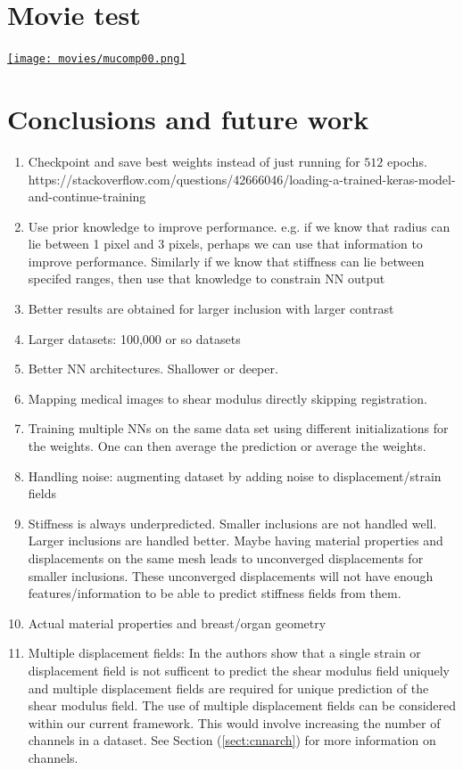\documentclass[12pt]{article}
\begin{document}
\section{Movie test}
\href{run:movies/movie.mp4}{\texttt{[image: movies/mucomp00.png]}}
\section{Conclusions and future work}
\begin{enumerate}
\item{Checkpoint and save best weights instead of just running for $512$ epochs. https://stackoverflow.com/questions/42666046/loading-a-trained-keras-model-and-continue-training}
\item{Use prior knowledge to improve performance. e.g. if we know that radius can lie between 1 pixel and 3 pixels, perhaps we can use that information to improve performance. Similarly if we know that stiffness can lie between specifed ranges, then use that knowledge to constrain NN output}
\item{Better results are obtained for larger inclusion with larger contrast}
\item{Larger datasets: 100,000 or so datasets}
\item{Better NN architectures. Shallower or deeper.}
\item{Mapping medical images to shear modulus directly skipping registration.}
\item{Training multiple NNs on the same data set using different initializations for the weights. One can then average the prediction or average the weights.}
\item{Handling noise: augmenting dataset by adding noise to displacement/strain fields}
\item{Stiffness is always underpredicted. Smaller inclusions are not handled well. Larger inclusions are handled better. Maybe having material properties and displacements on the same mesh leads to unconverged displacements for smaller inclusions. These unconverged displacements will not have enough features/information to be able to predict stiffness fields from them.}
\item{Actual material properties and breast/organ geometry}
\item{Multiple displacement fields: In \cite{paper:barbonegokhale,paper:barbonebamber} the authors show that a single strain or displacement field is not sufficent to predict the shear modulus field uniquely and multiple displacement fields are required for unique prediction of the shear modulus field. The use of multiple displacement fields can be considered within our current framework. This would involve increasing the number of channels in a dataset. See Section (\ref{sect:cnnarch}) for more information on channels.} 

\end{enumerate}
\end{document}
